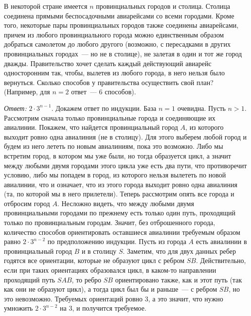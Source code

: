 \problem
В некоторой стране имеется $n$ провинциальных городов и столица.
Столица соединена прямыми беспосадочными авиарейсами со всеми городами.
Кроме того, некоторые пары провинциальных городов также соединены авиарейсами,
причем из любого провинциального города можно единственным образом добраться
самолетом до любого другого
(возможно, с пересадками в других провинциальных городах~--- но не в столице),
не залетая в один и тот же город дважды.
Правительство хочет сделать каждый действующий авиарейс односторонним
так, чтобы, вылетев из любого города, в него нельзя было вернуться.
Сколько способов у правительства осуществить свой план?
(Например, для $n = 2$ ответ~--- $6$ способов).

\solution
\emph{Ответ:} $2 \cdot 3^{n-1}$.
Докажем ответ по индукции.
База $n = 1$ очевидна.
Пусть $n > 1$.
Рассмотрим сначала только провинциальные города и соединяющие их авиалинии.
Покажем, что найдется провинциальный город $A$, из которого выходит ровно одна
авиалиния (не в столицу).
Для этого выберем любой город и будем из него лететь по новым авиалиниям, пока
это возможно.
Либо мы встретим город, в котором мы уже были, но тогда образуется цикл, а
значит между любыми двумя городами этого цикла уже есть два пути, что
противоречит условию, либо мы попадем в город, из которого нельзя вылететь по
новой авиалинии, что и означает, что из этого города выходит ровно одна
авиалиния (та, по которой мы в него прилетели).
Теперь рассмотрим опять все города и отбросим город $A$.
Несложно видеть, что между любыми двумя провинциальными городами по прежнему
есть только один путь, проходящий только по провинциальным городам.
Значит, без отброшенного города, количество способов ориентировать оставшиеся
авиалинии требуемым образом равно $2 \cdot 3^{n-2}$ по предположению индукции.
Пусть из города $A$ есть авиалинии в провинциальный город $B$ и в столицу $S$.
Заметим, что для двух данных ребер годятся все ориентации, которые не образуют
цикл с ребром $SB$.
Действительно, если при таких ориентациях образовался цикл, в каком-то
направлении проходящий путь $SAB$, то ребро $SB$ ориентировано также, как и
этот путь (так как они не образуют цикл), а тогда цикл был бы и раньше~---
с ребром $SB$, но это невозможно.
Требуемых ориентаций ровно 3, а это значит, что нужно умножить
$2 \cdot 3^{n-2}$ на 3, и получится требуемое. 

\endproblem
